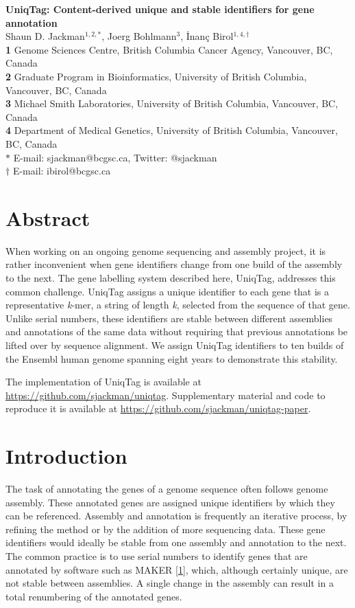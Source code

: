 \documentclass[10pt]{article}
\date{}
\begin{document}
\begin{flushleft}
{\large
\textbf{UniqTag: Content-derived unique and stable identifiers for gene annotation}
}
\\
Shaun D. Jackman$^{1,2,\ast}$,
Joerg Bohlmann$^{3}$,
\.{I}nan\c{c} Birol$^{1,4,\dagger}$
\\ \textbf{1} Genome Sciences Centre, British Columbia Cancer Agency, Vancouver, BC, Canada
\\ \textbf{2} Graduate Program in Bioinformatics, University of British Columbia, Vancouver, BC, Canada
\\ \textbf{3} Michael Smith Laboratories, University of British Columbia, Vancouver, BC, Canada
\\ \textbf{4} Department of Medical Genetics, University of British Columbia, Vancouver, BC, Canada
\\ $\ast$ E-mail: sjackman@bcgsc.ca, Twitter: @sjackman
\\ $\dagger$ E-mail: ibirol@bcgsc.ca
\end{flushleft}
\section{Abstract}\label{abstract}

When working on an ongoing genome sequencing and assembly project, it is
rather inconvenient when gene identifiers change from one build of the
assembly to the next. The gene labelling system described here, UniqTag,
addresses this common challenge. UniqTag assigns a unique identifier to
each gene that is a representative \emph{k}-mer, a string of length
\emph{k}, selected from the sequence of that gene. Unlike serial
numbers, these identifiers are stable between different assemblies and
annotations of the same data without requiring that previous annotations
be lifted over by sequence alignment. We assign UniqTag identifiers to
ten builds of the Ensembl human genome spanning eight years to
demonstrate this stability.

The implementation of UniqTag is available at
\url{https://github.com/sjackman/uniqtag}. Supplementary material and
code to reproduce it is available at
\url{https://github.com/sjackman/uniqtag-paper}.

\section{Introduction}\label{introduction}

The task of annotating the genes of a genome sequence often follows
genome assembly. These annotated genes are assigned unique identifiers
by which they can be referenced. Assembly and annotation is frequently
an iterative process, by refining the method or by the addition of more
sequencing data. These gene identifiers would ideally be stable from one
assembly and annotation to the next. The common practice is to use
serial numbers to identify genes that are annotated by software such as
MAKER {[}\href{http://dx.doi.org/10.1104/pp.113.230144}{1}{]}, which,
although certainly unique, are not stable between assemblies. A single
change in the assembly can result in a total renumbering of the
annotated genes.
\end{document}
